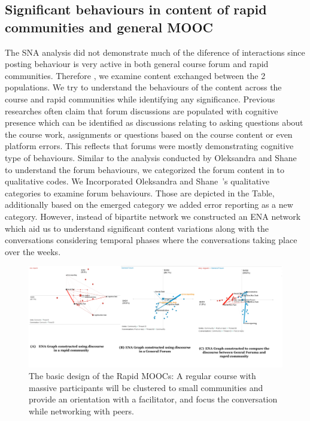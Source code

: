 \documentclass[manuscript,screen,review]{acmart}
\begin{document}
\subsection{Significant behaviours in content of rapid communities and general MOOC}

The SNA analysis did not demonstrate much of the diference of interactions since posting behaviour is very active in both general course forum and rapid communities. Therefore , we examine content exchanged between the 2 populations. We try to understand the behaviours of the content across the course and rapid communities while identifying any significance. Previous researches often claim that forum discussions are populated with cognitive presence which can be identified as discussions relating to asking questions about the course work, assignments or questions based on the course content or even platform errors. This reflects that forums were mostly demonstrating cognitive type of behaviours. Similar to the analysis conducted by Oleksandra and Shane~\cite{oleksandra2016untangling} to understand the forum behaviours, we categorized the forum content in to qualitative codes. We Incorporated  Oleksandra and Shane~\cite{oleksandra2016untangling}'s qualitative categories to examine forum behaviours. Those are depicted in the Table, additionally based on the emerged category we added error reporting as a new category. However, instead of bipartite network we constructed an ENA network which aid us to understand significant content variations along with the conversations considering temporal phases where the conversations taking place over the weeks. 

\begin{figure}[h]
  \centering
  \includegraphics[width=\linewidth]{images/ENA Diagrams.png}
  \caption{The basic design of the Rapid MOOCs: A regular course with massive participants will be clustered to small communities and provide an orientation with a facilitator, and focus the conversation while networking with peers.}
 \label{fig:ENADiagrams}
\end{figure}
\end{document}

